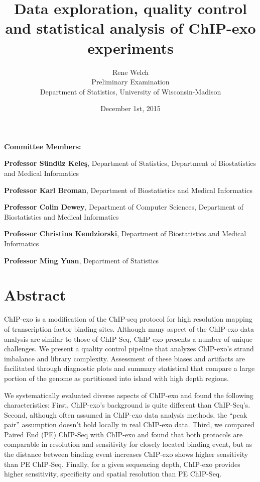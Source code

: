 \documentclass[11pt]{article}\usepackage[]{graphicx}\usepackage[]{color}
\title{Data exploration, quality control and statistical analysis of
  ChIP-exo experiments\vspace*{\fill}}
\author{Rene Welch\\Preliminary Examination\\Department of Statistics,
  University of Wisconsin-Madison}
\date{December 1st, 2015}
\begin{document}
\newcommand{\sig}{\sigma^{70}}


\maketitle

\vspace*{\fill}

\textbf{Committee Members:}

\textbf{Professor S\"und\"uz Kele\c{s}}, Department of Statistics,
Department of Biostatistics and Medical Informatics

\textbf{Professor Karl Broman}, Department of Biostatistics and
Medical Informatics

\textbf{Professor Colin Dewey}, Department of Computer Sciences,
Department of Biostatistics and Medical Informatics

\textbf{Professor Christina Kendziorski}, Department of Biostatistics
and Medical Informatics

\textbf{Professor Ming Yuan}, Department of Statistics

\thispagestyle{empty}


\newpage

\tableofcontents

\newpage

\listoffigures

\newpage


\section*{Abstract}

ChIP-exo is a modification of the ChIP-seq protocol for high
resolution mapping of transcription factor binding sites. Although
many aspect of the ChIP-exo data analysis are similar to those of
ChIP-Seq, ChIP-exo presents a number of unique challenges. We present
a quality control pipeline that analyzes ChIP-exo's strand imbalance
and library complexity. Assessment of these biases and artifacts are
facilitated through diagnostic plots and summary statistical that
compare a large portion of the genome as partitioned into island with
high depth regions.

We systematically evaluated diverse aspects of ChIP-exo and found the
following characteristics: First, ChIP-exo's background is quite
different than ChIP-Seq's. Second, although often assumed in ChIP-exo
data analysis methods, the ``peak pair'' assumption doesn't hold
locally in real ChIP-exo data. Third, we compared Paired End (PE)
ChIP-Seq with ChIP-exo and found that both protocols are comparable in
resolution and sensitivity for closely located binding event, but as
the distance between binding event increases ChIP-exo shows higher
sensitivity than PE ChIP-Seq. Finally, for a given sequencing depth,
ChIP-exo provides higher sensitivity, specificity and spatial
resolution than PE ChIP-Seq.
\end{document}
